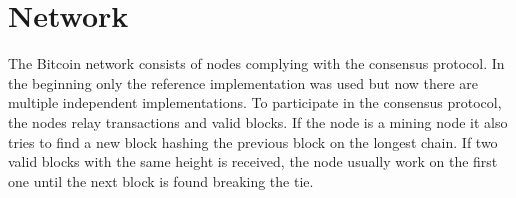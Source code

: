 \section{Network}

The Bitcoin network consists of nodes complying with the consensus protocol. In the beginning only the reference implementation was used but now there are multiple independent implementations\cite{repository:bitcoin}\cite{repository:btcd}\cite{repository:neutrino}. To participate in the consensus protocol, the nodes relay transactions and valid blocks. If the node is a mining node it also tries to find a new block hashing the previous block on the longest chain. If two valid blocks with the same height is received, the node usually work on the first one until the next block is found breaking the tie. 


